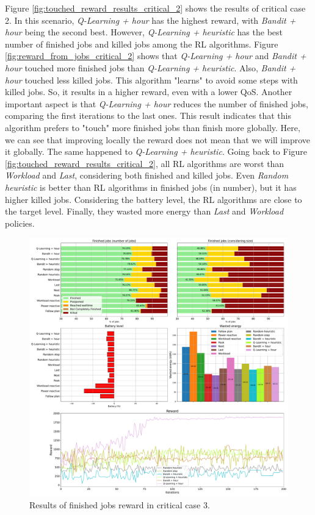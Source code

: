 Figure \ref{fig:touched_reward_results_critical_2} shows the results of critical case 2. In this scenario, \emph{Q-Learning + hour} has the highest reward, with \emph{Bandit + hour} being the second best. However, \emph{Q-Learning + heuristic} has the best number of finished jobs and killed jobs among the RL algorithms. Figure \ref{fig:reward_from_jobs_critical_2} shows that \emph{Q-Learning + hour} and \emph{Bandit + hour} touched more finished jobs than \emph{Q-Learning + heuristic}. Also, \emph{Bandit + hour} touched less killed jobs. This algorithm "learns" to avoid some steps with killed jobs. So, it results in a higher reward, even with a lower QoS. Another important aspect is that \emph{Q-Learning + hour} reduces the number of finished jobs, comparing the first iterations to the last ones. This result indicates that this algorithm prefers to "touch" more finished jobs than finish more globally. Here, we can see that improving locally the reward does not mean that we will improve it globally. The same happened to \emph{Q-Learning + heuristic}. Going back to Figure \ref{fig:touched_reward_results_critical_2}, all RL algorithms are worst than \emph{Workload} and \emph{Last}, considering both finished and killed jobs. Even \emph{Random heuristic} is better than RL algorithms in finished jobs (in number), but it has higher killed jobs. Considering the battery level, the RL algorithms are close to the target level. Finally, they wasted more energy than \emph{Last} and \emph{Workload} policies. 

\begin{figure}[!htb]
    \centering
    \includegraphics[scale=0.29]{Images/Learning_compensations/reward_finished_touched_profile_worst_workload_1_with_noise_state_delta.pdf}
    \caption{Results of finished jobs reward in critical case 3.}
    \label{fig:touched_reward_results_critical_3}
\end{figure}

